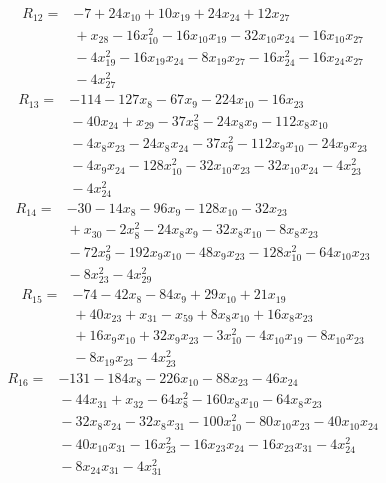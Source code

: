 \begin{align*}
R_{12} ={}& -7 + 24x_{10} + 10x_{19} + 24x_{24} + 12x_{27} \\
&{} + x_{28} - 16x_{10}^{2} - 16x_{10} x_{19} - 32x_{10} x_{24} - 16x_{10} x_{27} \\
&{} -4x_{19}^{2} - 16x_{19} x_{24} - 8x_{19} x_{27} - 16x_{24}^{2} - 16x_{24} x_{27} \\
&{} -4x_{27}^{2}
\end{align*}
\begin{align*}
R_{13} ={}& -114 - 127x_{8} - 67x_{9} - 224x_{10} - 16x_{23} \\
&{} -40x_{24} + x_{29} - 37x_{8}^{2} - 24x_{8} x_{9} - 112x_{8} x_{10} \\
&{} -4x_{8} x_{23} - 24x_{8} x_{24} - 37x_{9}^{2} - 112x_{9} x_{10} - 24x_{9} x_{23} \\
&{} -4x_{9} x_{24} - 128x_{10}^{2} - 32x_{10} x_{23} - 32x_{10} x_{24} - 4x_{23}^{2} \\
&{} -4x_{24}^{2}
\end{align*}
\begin{align*}
R_{14} ={}& -30 - 14x_{8} - 96x_{9} - 128x_{10} - 32x_{23} \\
&{} + x_{30} - 2x_{8}^{2} - 24x_{8} x_{9} - 32x_{8} x_{10} - 8x_{8} x_{23} \\
&{} -72x_{9}^{2} - 192x_{9} x_{10} - 48x_{9} x_{23} - 128x_{10}^{2} - 64x_{10} x_{23} \\
&{} -8x_{23}^{2} - 4x_{29}^{2}
\end{align*}
\begin{align*}
R_{15} ={}& -74 - 42x_{8} - 84x_{9} + 29x_{10} + 21x_{19} \\
&{} + 40x_{23} + x_{31} - x_{59} + 8x_{8} x_{10} + 16x_{8} x_{23} \\
&{} + 16x_{9} x_{10} + 32x_{9} x_{23} - 3x_{10}^{2} - 4x_{10} x_{19} - 8x_{10} x_{23} \\
&{} -8x_{19} x_{23} - 4x_{23}^{2}
\end{align*}
\begin{align*}
R_{16} ={}& -131 - 184x_{8} - 226x_{10} - 88x_{23} - 46x_{24} \\
&{} -44x_{31} + x_{32} - 64x_{8}^{2} - 160x_{8} x_{10} - 64x_{8} x_{23} \\
&{} -32x_{8} x_{24} - 32x_{8} x_{31} - 100x_{10}^{2} - 80x_{10} x_{23} - 40x_{10} x_{24} \\
&{} -40x_{10} x_{31} - 16x_{23}^{2} - 16x_{23} x_{24} - 16x_{23} x_{31} - 4x_{24}^{2} \\
&{} -8x_{24} x_{31} - 4x_{31}^{2}
\end{align*}
